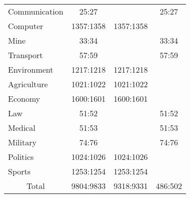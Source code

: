 \begin{table}[h]
\begin{minipage}{\textwidth}
\begin{subtable}{0.42\textwidth}
{\begin{tabular}{|l|c|c|c|}
	Communication                 & 25:27     &           & 25:27   \\ \cline{1-2} \cline{3-4}
	Computer                      & 1357:1358 & 1357:1358 &         \\ \cline{1-2} \cline{3-4}
	Mine                          & 33:34     &           & 33:34   \\ \hline
	Transport                     & 57:59     &           & 57:59   \\ \cline{1-2} \cline{3-4}
	Environment                   & 1217:1218 & 1217:1218 &         \\ \cline{1-2} \cline{3-4}
	Agriculture                   & 1021:1022 & 1021:1022 &         \\ \cline{1-2} \cline{3-4}
	Economy                       & 1600:1601 & 1600:1601 &         \\ \hline
	Law                           & 51:52     &           & 51:52   \\ \hline
	Medical                       & 51:53     &           & 51:53   \\ \cline{1-2} \cline{3-4}
	Military                      & 74:76     &           & 74:76   \\ \cline{1-2} \cline{3-4}
	Politics                      & 1024:1026 & 1024:1026 &         \\ \cline{1-2} \cline{3-4}
	Sports                        & 1253:1254 & 1253:1254 &         \\ \hline
	\multicolumn{1}{|c|}{Total}   & 9804:9833 & 9318:9331 & 486:502 \\ \hline
\end{tabular}}
\end{subtable}
\end{minipage}
\end{table}